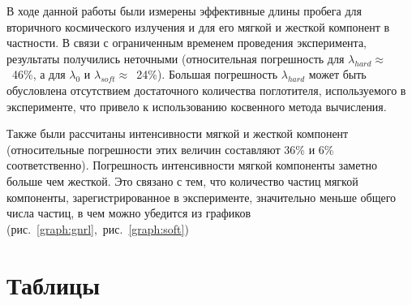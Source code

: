 \documentclass[reprint, nofootinbib, nobalancelastpage, 10pt]{revtex4-2}
\begin{document}
В ходе данной работы были измерены эффективные длины пробега для вторичного космического
излучения и для его мягкой и жесткой компонент в частности. В связи с ограниченным
временем проведения эксперимента, результаты получились неточными (относительная
погрешность для $\lambda_{hard} \approx$~46\%, а для $\lambda_0$ и
$\lambda_{soft} \approx$~24\%). Большая погрешность $\lambda_{hard}$ может быть
обусловлена отсутствием достаточного количества поглотителя, используемого в эксперименте,
что привело к использованию косвенного метода вычисления.

Также были рассчитаны интенсивности мягкой и жесткой компонент (относительные погрешности этих
величин составляют 36\% и 6\% соответственно). Погрешность интенсивности мягкой компоненты
заметно больше чем жесткой. Это связано с тем, что количество частиц мягкой компоненты,
зарегистрированное в эксперименте, значительно меньше общего числа частиц, в чем можно
убедится из графиков (рис.~\ref{graph:gnrl},~рис.~\ref{graph:soft})

\newpage
\appendix

\section*{Таблицы}



\end{document}
